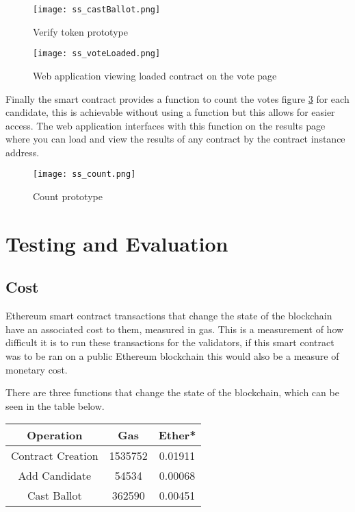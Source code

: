 \documentclass{entcs}
\begin{document}
\begin{figure}[h!]
    \centering
    \texttt{[image: ss\_castBallot.png]}
    \caption{Verify token prototype}
    \label{fig:castBallot}
\end{figure}

\begin{figure}[h!]
    \centering
    \texttt{[image: ss\_voteLoaded.png]}
    \caption{Web application viewing loaded contract on the vote page}
    \label{fig:vote_loaded}
\end{figure}

Finally the smart contract provides a function to count the votes figure \ref{fig:count} for each candidate, this is achievable without using a function but this allows for easier access. The web application interfaces with this function on the results page where you can load and view the results of any contract by the contract instance address.


\begin{figure}[h!]
    \centering
    \texttt{[image: ss\_count.png]}
    \caption{Count prototype}
    \label{fig:count}
\end{figure}

\pagebreak
\section{Testing and Evaluation}

\subsection{Cost} \label{sec: cost}
Ethereum smart contract transactions that change the state of the blockchain have an associated cost to them, measured in gas. This is a measurement of how difficult it is to run these transactions for the validators, if this smart contract was to be ran on a public Ethereum blockchain this would also be a measure of monetary cost. 

There are three functions that change the state of the blockchain, which can be seen in the table below.

\begin{table}[h!]
\centering
\begin{tabular}{|c c c|}
 \hline
 Operation & Gas & Ether* \\ 
 \hline
 Contract Creation & 1535752 & 0.01911 \\  
 Add Candidate & 54534 & 0.00068 \\  
 Cast Ballot & 362590 & 0.00451 \\  
 \hline
\end{tabular}
\end{table}
\end{document}
